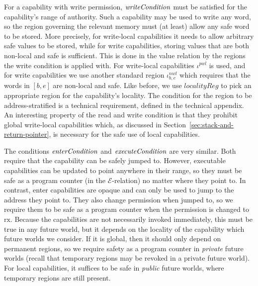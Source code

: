 \documentclass[compsoc,conference,letterpaper,fleqn]{IEEEtran}
\newcommand{\var}[1]{\mathit{#1}}
\newcommand{\start}{\var{b}}
\newcommand{\addrend}{\var{e}}
\newcommand{\nwl}{\var{nwl}}
\newcommand{\pwl}{\var{pwl}}
\newcommand{\plainfun}[2]{
  \ifthenelse{\equal{#2}{}}
  {\mathit{#1}}
  {\mathit{#1}(#2)}
}
\newcommand{\writeCond}[1]{\plainfun{writeCondition}{#1}}
\newcommand{\execCond}[1]{\plainfun{executeCondition}{#1}}
\newcommand{\entryCond}[1]{\plainfun{enterCondition}{#1}}
\newcommand{\asmType}{\plaindom{AsmType}}
\newcommand{\plaindom}[1]{\mathrm{#1}}
\newcommand{\intr}[2]{\mathcal{#1}}
\newcommand{\exprintr}[1]{\intr{E}{#1}}
\newcommand{\stder}{\exprintr{\asmType}}
\newcommand{\plainperm}[1]{\mathrm{#1}}
\newcommand{\exec}{\plainperm{rx}}
\begin{document}
For a capability with write permission, $\writeCond{}$ must be
satisfied for the capability's range of authority. Such a capability
may be used to write any word, so the region governing the relevant
memory must (at least) allow any safe word to be stored. More
precisely, for write-local capabilities it needs to allow arbitrary
safe values to be stored, while for write capabilities, storing values
that are both non-local and safe is sufficient.  This is done in the
value relation by the regions the write condition is applied with. For
write-local capabilities $\iota^\pwl$ is used, and for write
capabilities we use another standard region
$\iota^\nwl_{\start,\addrend}$ which requires that the words in
$[\start,\addrend]$ are non-local and safe.  Like before, we use
$\var{localityReg}$ to pick an appropriate region for the capability's
locality. The condition for the region to be address-stratified is a
technical requirement, defined in the technical appendix.
An interesting property of the read and write condition is that they
prohibit global write-local capabilities which, as discussed in
Section~\ref{sec:stack-and-return-pointer}, is necessary for the safe
use of local capabilities.

The conditions $\entryCond{}$ and $\execCond{}$ are very similar. Both require
that the capability can be safely jumped to. However, executable capabilities
can be updated to point anywhere in their range, so they must be safe as a
program counter (in the $\stder$-relation) no matter where they point to. In
contrast, enter capabilities are opaque and can only be used to jump to the
address they point to. They also change permission when jumped to, so we require
them to be safe as a program counter when the permission is changed to $\exec$.
Because the capabilities are not necessarily invoked immediately, this must be
true in any future world, but it depends on the locality of the capability which
future worlds we consider. If it is global, then it should only depend on
permanent regions, so we require safety as a program counter in \emph{private}
future worlds (recall that temporary regions may be revoked in a private future
world). For local capabilities, it suffices to be safe in \emph{public} future
worlds, where temporary regions are still present.
\end{document}
